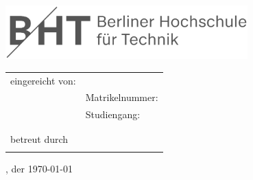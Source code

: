 \begin{titlepage}
	\begin{center}
		\begin{spacing}{2.5}
			{\Huge \bhtTitle}
		\end{spacing}

		\vspace*{1cm}

		\begin{spacing}{1.5}
			{\Large \bhtSubtitle}
		\end{spacing}

		\vspace*{1cm}
		{\includegraphics[width=0.7\textwidth]{images/bht_logo.eps}}

		\begin{spacing}{1.5}
			{\Large \bhtDocumentType}
		\end{spacing}
	\end{center}

	\begin{flushleft}
		\begin{tabular}{ll}
			eingereicht von: & \bhtAuthor\\
			& Matrikelnummer: \bhtMatriculationNumber\\
			& Studiengang: \bhtCourse\\
			& \bhtUniversity\\
			& \\
			betreut durch & \bhtCaretakerFirst \\
			& \bhtCaretakerUniversityFirst
		\end{tabular}
	\end{flushleft}

	\vspace*{1cm}
	\bhtTown, der \today
\end{titlepage}
\restoregeometry
\thispagestyle{empty}
